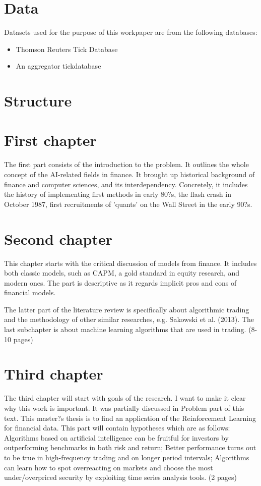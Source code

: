 \documentclass{pracamgr_wne}\usepackage[]{graphicx}\usepackage[]{color}
\begin{document}
\section{Data}
Datasets used for the purpose of this workpaper are from the following databases:
\begin{itemize}
\item Thomson Reuters Tick Database
\item An aggregator tickdatabase
\end{itemize}

\section{Structure}

\section{First chapter}

The first part consists of the introduction to the problem. It outlines
the whole concept of the AI-related 
fields in finance.
It brought up historical background of finance and computer sciences, and its interdependency. Concretely, it 
includes the history of implementing first methods in early 80?s, the flash crash in October 1987, first 
recruitments of 'quants' on the Wall Street in the early 90?s.


\section{Second chapter}
This chapter starts with the critical discussion of models from finance. It includes both classic models, such as CAPM, a gold standard in equity research, and modern ones. The part is descriptive as it regards implicit pros and cons of financial models.

The latter part of the literature review is specifically about algorithmic trading and the methodology of other similar researches, e.g. Sakowski et al. (2013).
The last subchapter is about machine learning algorithms that are used in trading.
(8-10 pages)

\section{Third chapter}
The third chapter will start with goals of the research. I want to make it clear why this work is important. It was partially discussed in Problem part of this text. This master?s thesis is to find an application of the Reinforcement Learning for financial data. This part will contain hypotheses which are as follows:
  Algorithms based on artificial intelligence can be fruitful for investors by outperforming benchmarks in both risk and return;
Better performance turns out to be true in high-frequency trading and on longer period intervals;
Algorithms can learn how to spot overreacting on markets and choose the most under/overpriced security by exploiting time series analysis tools. 
(2 pages)
\end{document}
